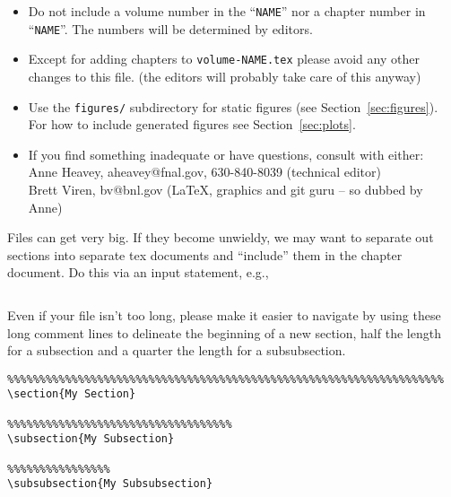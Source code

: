 \begin{itemize}
\item Do not include a volume number in the ``\texttt{NAME}'' nor a chapter number in ``\texttt{NAME}''.  The numbers will be determined by editors. 
\item Except for adding chapters to \texttt{volume-NAME.tex} please avoid any other changes to this file.   (the editors will probably take care of this anyway)
\item Use the \texttt{figures/} subdirectory for static figures (see Section~\ref{sec:figures}). For how to include generated figures see Section~\ref{sec:plots}.
\item If you find something inadequate or have questions, consult with either: \\
Anne Heavey, aheavey@fnal.gov, 630-840-8039 (technical editor)\\
Brett Viren, bv@bnl.gov (\LaTeX{}, graphics and git guru  -- so dubbed by Anne)
\end{itemize}

Files can get very big.  If they become unwieldy, we may want to separate out sections into 
separate tex documents and ``include'' them in the chapter document. Do this via an input 
statement, e.g.,
\begin{verbatim}

\end{verbatim}

Even if your file isn't too long, please make it easier to navigate by using these long comment lines
to delineate the beginning of a new section, half the length for a subsection and a quarter the
length for a subsubsection.  

\begin{verbatim}
%%%%%%%%%%%%%%%%%%%%%%%%%%%%%%%%%%%%%%%%%%%%%%%%%%%%%%%%%%%%%%%%%%%%
\section{My Section}

%%%%%%%%%%%%%%%%%%%%%%%%%%%%%%%%%%%
\subsection{My Subsection}

%%%%%%%%%%%%%%%%
\subsubsection{My Subsubsection}
\end{verbatim}


